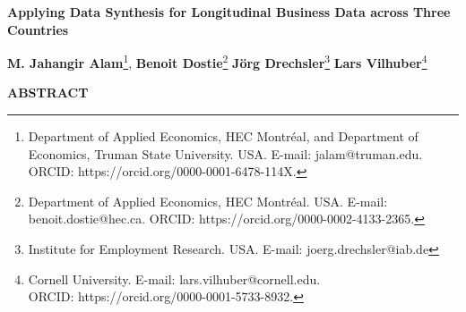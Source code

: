 \documentclass[10pt]{article}
\def \mytitle{Applying Data Synthesis for Longitudinal Business Data across Three Countries }
\begin{document}
\thispagestyle{empty}


\begin{onehalfspace}
	\begin{center} 
		{\Large \bf {\mytitle} }
	\end{center}
\end{onehalfspace}

\vspace*{-4mm}

\begin{center}
	\begin{large} 
	{\bf M. Jahangir Alam}\footnote{Department of Applied Economics, HEC Montr\'eal, and Department of Economics, Truman State University. USA. E-mail: jalam@truman.edu.\\ ORCID: https://orcid.org/0000-0001-6478-114X.},
	{\bf Benoit Dostie}\footnote{Department of Applied Economics, HEC Montr\'eal. USA. E-mail: benoit.dostie@hec.ca. ORCID: https://orcid.org/0000-0002-4133-2365.}	 
    {\bf J\"org Drechsler}\footnote{Institute for Employment Research. USA. E-mail: joerg.drechsler@iab.de}	 
    {\bf Lars Vilhuber}\footnote{Cornell University. E-mail: lars.vilhuber@cornell.edu. \\ORCID: https://orcid.org/0000-0001-5733-8932.}	 
    \end{large}
\end{center}


\begin{center}\begin{large} \textbf{ABSTRACT} \end{large} \end{center}
\end{document}
